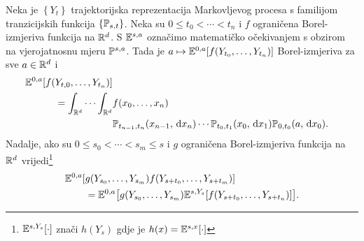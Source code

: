 \documentclass[main.tex]{subfiles}
\begin{document}
\begin{propozicija}
	Neka je \( \left\{ Y_t \right\} \) trajektorijska reprezentacija Markovljevog procesa s
	familijom tranzicijskih funkcija \( \left\{ \Ptrans_{s, t}  \right\} \). Neka su
	\( 0 \le t_0 < \cdots < t_n \) i \( f \) ograničena Borel-izmjeriva funkcija na \( \R^d \).
	S \( \E^{s,a} \) označimo matematičko očekivanjem s obzirom na vjerojatnosnu mjeru
	\( \P^{s,a} \). Tada je \( a \mapsto \E^{0,a}[f(Y_{t_0},\ldots,Y_{t_n})] \) Borel-izmjeriva za sve \( a \in \R^d \) i
	\begin{equation} \label{markov-prop1}
		\begin{aligned}
			\E^{0,a}[f(Y_{t,0},\ldots,Y_{t_n})]                                               \\
			= \int_{\R^d} \cdots \int_{\R^d} & f(x_0,\ldots,x_n)                              \\
			                                 & \Ptrans_{t_{n-1}, t_n}(x_{n-1}, \D x_n) \cdots
			\Ptrans_{t_0, t_1}(x_0, \D x_1) \Ptrans_{0, t_0}(a, \D x_0).
		\end{aligned}
	\end{equation}
	Nadalje, ako su \( 0 \le s_0 < \cdots < s_m \le s \) i \( g \) ograničena Borel-izmjeriva
	funkcija na \( \R^d \) vrijedi\footnote{\( \E^{s,Y_s}[\cdot] \) znači \( h(Y_s) \) gdje
		je \( h(x) = \E^{s,x}[\cdot] \)}
	\begin{equation} \label{markov-svojstvo}
		\begin{aligned}
			\E^{0,a}[ & g(Y_{s_0},\ldots,Y_{s_m}) f(Y_{s+t_0},\ldots,Y_{s+t_m})]                                   \\
			          & =\E^{0,a}\bigl[g(Y_{s_0},\ldots,Y_{s_m}) \E^{s, Y_s}[f(Y_{s+t_0},\ldots,Y_{s+t_n})]\bigr].
		\end{aligned}
	\end{equation}
\end{propozicija}
\end{document}
